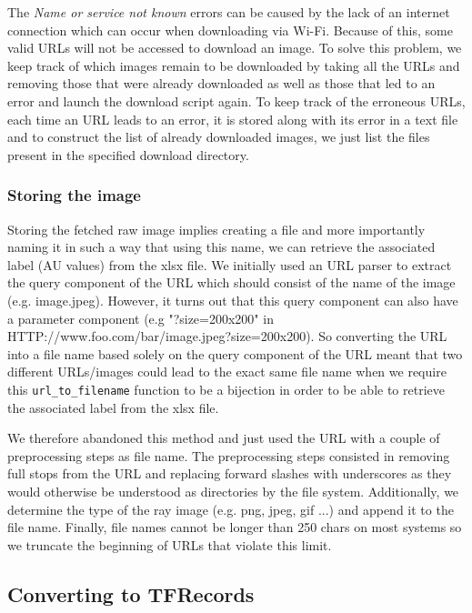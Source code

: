 \documentclass[12pt,twoside]{article}
\begin{document}
The \textit{Name or service not known} errors can be caused by the lack of an internet connection which can occur when downloading via Wi-Fi. Because of this, some valid URLs will not be accessed to download an image. To solve this problem, we keep track of which images remain to be downloaded by taking all the URLs and removing those that were already downloaded as well as those that led to an error and launch the download script again. To keep track of the erroneous URLs, each time an URL leads to an error, it is stored along with its error in a text file and to construct the list of already downloaded images, we just list the files present in the specified download directory.

\subsubsection{Storing the image}

Storing the fetched raw image implies creating a file and more importantly naming it in such a way that using this name, we can retrieve the associated label (AU values) from the xlsx file. We initially used an URL parser to extract the query component of the URL which should consist of the name of the image (e.g. image.jpeg). However, it turns out that this query component can also have a parameter component (e.g "?size=200x200" in HTTP://www.foo.com/bar/image.jpeg?size=200x200). So converting the URL into a file name based solely on the query component of the URL meant that two different URLs/images could lead to the exact same file name when we require this \texttt{url\_to\_filename} function to be a bijection in order to be able to retrieve the associated label from the xlsx file.

We therefore abandoned this method and just used the URL with a couple of preprocessing steps as file name. The preprocessing steps consisted in removing full stops from the URL and replacing forward slashes with underscores as they would otherwise be understood as directories by the file system. Additionally, we determine the type of the ray image (e.g. png, jpeg, gif ...) and append it to the file name. Finally, file names cannot be longer than 250 chars on most systems so we truncate the beginning of URLs that violate this limit.

\subsection{Converting to TFRecords}
\end{document}
